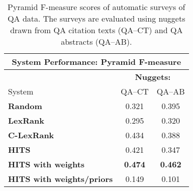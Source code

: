\begin{table}
{\small
\centering
\begin{tabular}{l cc}
\hline
\multicolumn{3}{c}{\bf System Performance: Pyramid F-measure}\\ \hline
& \multicolumn{2}{c}{\bf Nuggets:}\\ 
System & QA--CT & QA--AB\\ \hline \hline
{\bf Random}                    & 0.321 & 0.395\\
{\bf LexRank}                   & 0.295 & 0.320\\
{\bf C-LexRank}                 & 0.434 & 0.388\\
{\bf HITS}                      & 0.421 & 0.347\\
{\bf HITS with weights}         & {\bf 0.474} & {\bf 0.462}\\
{\bf HITS with weights/priors}  & 0.149 & 0.101\\
\hline
\end{tabular}}
\caption{Pyramid F-measure scores of automatic surveys of QA data. The surveys are evaluated using nuggets drawn from QA citation texts (QA--CT) and QA abstracts (QA--AB).}
\label{tab:nugget}
\end{table}

